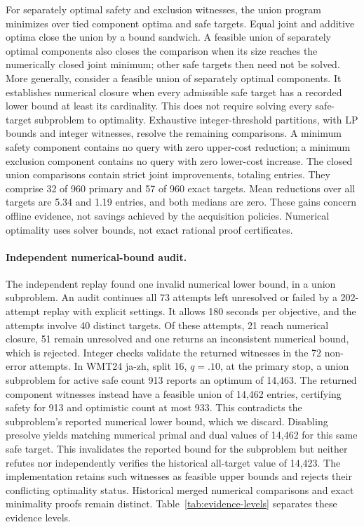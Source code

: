 For separately optimal safety and exclusion witnesses, the union program minimizes over tied component optima and safe targets. Equal joint and additive optima close the union by a bound sandwich. A feasible union of separately optimal components also closes the comparison when its size reaches the numerically closed joint minimum; other safe targets then need not be solved. More generally, consider a feasible union of separately optimal components. It establishes numerical closure when every admissible safe target has a recorded lower bound at least its cardinality. This does not require solving every safe-target subproblem to optimality. Exhaustive integer-threshold partitions, with LP bounds and integer witnesses, resolve the remaining comparisons. A minimum safety component contains no query with zero upper-cost reduction; a minimum exclusion component contains no query with zero lower-cost increase. The \fullMeanUnionProven{} closed union comparisons contain \fullMeanStrictGain{} strict joint improvements, totaling \fullMeanJointSaving{} entries. They comprise 32 of 960 primary and 57 of 960 exact targets. Mean reductions over all targets are 5.34 and 1.19 entries, and both medians are zero. These gains concern offline evidence, not savings achieved by the acquisition policies. Numerical optimality uses solver bounds, not exact rational proof certificates.
\paragraph{Independent numerical-bound audit.}
\label{app:solver-audit}
The independent replay found one invalid numerical lower bound, in a union subproblem. An audit continues all 73 attempts left unresolved or failed by a 202-attempt replay with explicit settings. It allows 180 seconds per objective, and the attempts involve 40 distinct targets. Of these attempts, 21 reach numerical closure, 51 remain unresolved and one returns an inconsistent numerical bound, which is rejected. Integer checks validate the returned witnesses in the 72 non-error attempts. In WMT24 ja-zh, split 16, $q=.10$, at the primary stop, a union subproblem for active safe count 913 reports an optimum of 14,463. The returned component witnesses instead have a feasible union of 14,462 entries, certifying safety for 913 and optimistic count at most 933. This contradicts the subproblem's reported numerical lower bound, which we discard. Disabling presolve yields matching numerical primal and dual values of 14,462 for this same safe target. This invalidates the reported bound for the subproblem but neither refutes nor independently verifies the historical all-target value of 14,423. The implementation retains such witnesses as feasible upper bounds and rejects their conflicting optimality status. Historical merged numerical comparisons and exact minimality proofs remain distinct. Table~\ref{tab:evidence-levels} separates these evidence levels.

